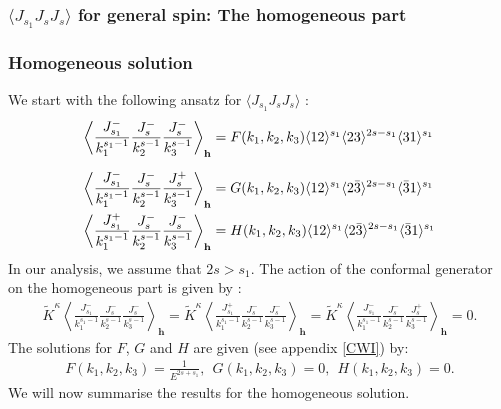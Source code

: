 \documentclass[a4paper,11pt]{article}
\begin{document}
\subsubsection{$\langle J_{s_1} J_{s} J_s \rangle$ for general spin: The homogeneous part}
\label{SectionJs1JsJs}
\subsubsection*{Homogeneous solution}
We start with the following ansatz for $\langle J_{s_1} J_s J_s \rangle$ :
\begin{align}
\label{jsjsjsgeneralformfactors}
\left\langle \frac{J^-_{s_1}}{k_1^{s_1-1}}\frac{J^-_s}{k_2^{s-1}} \frac{J^-_{s}}{k_3^{s-1}} \right\rangle_{\textbf{h}} &=F(k_1,k _2, k_3)\langle 12 \rangle^{s_1} \langle 23 \rangle^{2s-s_1} \langle 31 \rangle^{s_1}\notag\\[6 pt]
\left\langle \frac{J^-_{s_1}}{k_1^{s_1-1}}\frac{J^-_{s}}{k_2^{s-1}} \frac{J^+_{s}}{k_3^{s-1}} \right\rangle_{\textbf{h}} &=G(k_1,k _2, k_3)\langle 12 \rangle^{s_1} \langle 2\bar{3} \rangle^{2s-s_1} \langle \bar{3}1 \rangle^{s_1}\notag\\
\left\langle \frac{J^+_{s_1}}{k_1^{s_1-1}}\frac{J^-_{s}}{k_2^{s-1}} \frac{J^-_{s}}{k_3^{s-1}} \right\rangle_{\textbf{h}} &=H(k_1,k _2, k_3)\langle 12 \rangle^{s_1} \langle 2\bar{3} \rangle^{2s-s_1} \langle \bar{3}1 \rangle^{s_1}
\end{align}
In our analysis, we assume that $2s>s_1.$ The action of the conformal generator on the homogeneous part is given by :
\begin{align}\label{Kkappajs1jsjs}
\widetilde{K}^{\kappa} \left\langle \frac{J^-_{s_1}}{k_1^{s_1-1}}\frac{J_s^-}{k_2^{s-1}} \frac{J_s^-}{k_3^{s-1}} \right \rangle_{\textbf{h}} =
\widetilde{K}^{\kappa} \left\langle \frac{J^+_{s_1}}{k_1^{s_1-1}}\frac{J_s^-}{k_2^{s-1}} \frac{J_s^-}{k_3^{s-1}} \right \rangle_{\textbf{h}} =
\widetilde{K}^{\kappa} \left\langle \frac{J^-_{s_1}}{k_1^{s_1-1}}\frac{J_s^-}{k_2^{s-1}} \frac{J_s^+}{k_3^{s-1}} \right \rangle_{\textbf{h}} =0.
\end{align}
The solutions for $F$, $G$ and $H$ are given (see appendix \ref{CWI}) by:
\begin{align}
\label{js1jsjsshsh}
F(k_1, k_2, k_3) = \frac{1}{E^{2s+s_1}},~~
G(k_1, k_2, k_3) = 0,~~
H(k_1, k_2, k_3) = 0.
\end{align}
 We will now summarise the results for the homogeneous solution.
\end{document}
